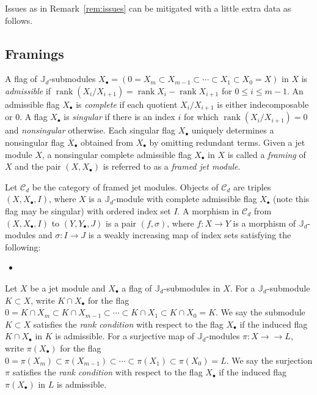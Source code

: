 \documentclass{amsart}
\numberwithin{equation}{section}
\theoremstyle{definition}
\def\JJ{\mathbb{J}}
\def\cC{\mathcal{C}}
\def\rank{\operatorname{rank}}
\newcommand{\onto}{\to\!\!\!\!\!\to}
\begin{document}
Issues as in Remark~\ref{rem:issues} can be mitigated with a little extra data as follows.

\subsection{Framings}\label{sec:framings}
A flag of $\JJ_d$-submodules $X_\bullet=(0=X_m\subset X_{m-1}\subset\cdots\subset X_1\subset X_0=X)$ in $X$ is \emph{admissible} if $\rank(X_i/X_{i+1})=\rank X_i-\rank X_{i+1}$ for $0\le i\le m-1$.  An admissible flag $X_\bullet$ is \emph{complete} if each quotient $X_i/X_{i+1}$ is either indecomposable or $0$.  A flag $X_\bullet$ is \emph{singular} if there is an index $i$ for which $\rank(X_i/X_{i+1})=0$ and \emph{nonsingular} otherwise.  Each singular flag $X_\bullet$ uniquely determines a nonsingular flag $\overline{X}_\bullet$ obtained from $X_\bullet$ by omitting redundant terms.  Given a jet module $X$, a nonsingular complete admissible flag $X_\bullet$ in $X$ is called a \emph{framing} of $X$ and the pair $(X,X_\bullet)$ is referred to as a \emph{framed jet module}.

Let $\cC_d$ be the category of framed jet modules.  Objects of $\cC_d$ are triples $(X,X_\bullet,I)$, where $X$ is a $\JJ_d$-module with complete admissible flag $X_\bullet$ (note this flag may be singular) with ordered index set $I$.  A morphism in $\cC_d$ from $(X,X_\bullet,I)$ to $(Y,Y_\bullet,J)$ is a pair $(f,\sigma)$, where $f:X\to Y$ is a morphism of $\JJ_d$-modules and $\sigma:I\to J$ is a weakly increasing map of index sets satisfying the following:
\begin{itemize}
  \item 
\end{itemize}

Let $X$ be a jet module and $X_\bullet$ a flag of $\JJ_d$-submodules in $X$.  For a $\JJ_d$-submodule $K\subset X$, write $K\cap X_\bullet$ for the flag $0=K\cap X_m\subset K\cap X_{m-1}\subset\cdots\subset K\cap X_1\subset K\cap X_0=K$.  We say the submodule $K\subset X$ satisfies the \emph{rank condition} with respect to the flag $X_\bullet$ if the induced flag $K\cap X_\bullet$ in $K$ is admissible.  For a surjective map of $\JJ_d$-modules $\pi:X\onto L$, write $\pi(X_\bullet)$ for the flag $0=\pi(X_m)\subset \pi(X_{m-1})\subset\cdots\subset \pi(X_1)\subset \pi(X_0)=L$.  We say the surjection $\pi$ satisfies the \emph{rank condition} with respect to the flag $X_\bullet$ if the induced flag $\pi(X_\bullet)$ in $L$ is admissible.
\end{document}
